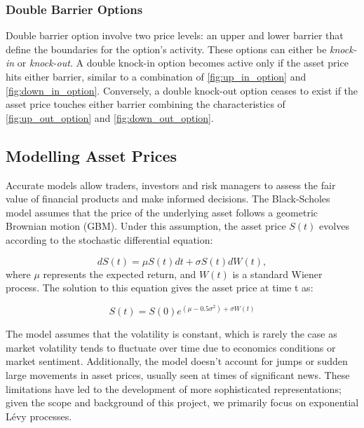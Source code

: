 \documentclass[a4paper]{report}
\begin{document}
\subsubsection{Double Barrier Options}\label{double_barrier}
Double barrier option involve two price levels: an upper and lower barrier that define the boundaries for the option's activity. These options can either be \textit{knock-in} or \textit{knock-out}. A double knock-in option becomes active only if the asset price hits either barrier, similar to a combination of \autoref{fig:up_in_option} and \autoref{fig:down_in_option}. Conversely, a double knock-out option ceases to exist if the asset price touches either barrier combining the characteristics of \autoref{fig:up_out_option} and \autoref{fig:down_out_option}.

\subsection{Modelling Asset Prices}
Accurate models allow traders, investors and risk managers to assess the fair value of financial products and make informed decisions. The Black-Scholes model assumes that the price of the underlying asset follows a geometric Brownian motion (GBM). Under this assumption, the asset price $S(t)$ evolves according to the stochastic differential equation:

\begin{equation}\label{black_scholes_equation}
dS(t) = \mu S(t) dt + \sigma S(t) dW(t),	
\end{equation}
where $\mu$ represents the expected return, and $W(t)$ is a standard Wiener process. The solution to this equation gives the asset price at time t as:

\begin{equation}
S(t) = S(0)e^{(\mu - 0.5 \sigma^2) + \sigma W(t)}	
\end{equation}

The model assumes that the volatility is constant, which is rarely the case as market volatility tends to fluctuate over time due to economics conditions or market sentiment. Additionally, the model doesn't account for jumps or sudden large movements in asset prices, usually seen at times of significant news. These limitations have led to the development of more sophisticated representations; given the scope and background of this project, we primarily focus on exponential L\'evy processes.
\end{document}
